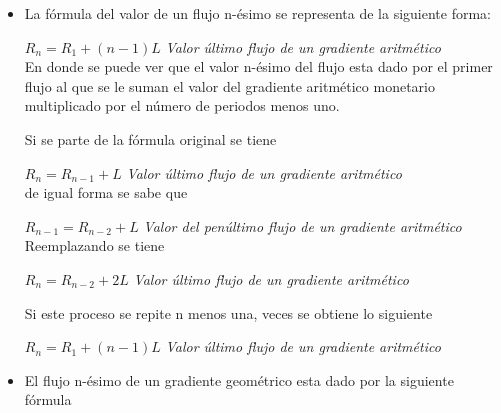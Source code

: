 \begin{itemize}
\item La fórmula del valor de un flujo n-ésimo se representa de la siguiente forma:

\vspace{4mm}

$R_{n}=R_{1} + (n-1)L$ \hspace{35 pt} \textit{Valor último flujo de un gradiente aritmético}\\

En donde se puede ver que el valor n-ésimo del flujo esta dado por el primer flujo al que se le suman el valor del gradiente aritmético monetario multiplicado por el número de periodos menos uno.

\vspace{4mm}

Si se parte de la fórmula original se tiene

\vspace{4mm}

$R_{n}=R_{n-1} + L$ \hspace{55 pt} \textit{Valor último flujo de un gradiente aritmético}\\

de igual forma se sabe que

\vspace{4mm}

$R_{n-1}=R_{n-2} +L$ \hspace{45 pt} \textit{Valor del penúltimo flujo de un gradiente aritmético}\\

Reemplazando se tiene

\vspace{4mm}

$R_{n}=R_{n-2} +2L$ \hspace{50 pt} \textit{Valor último flujo de un gradiente aritmético}\\

\vspace{4mm}

Si este proceso se repite n menos una, veces se obtiene lo siguiente

\vspace{4mm}

$R_{n}=R_{1} + (n-1)L$ \hspace{37 pt} \textit{Valor último flujo de un gradiente aritmético}\\


\item El flujo n-ésimo de un gradiente geométrico esta dado por la siguiente fórmula


\end{itemize}
